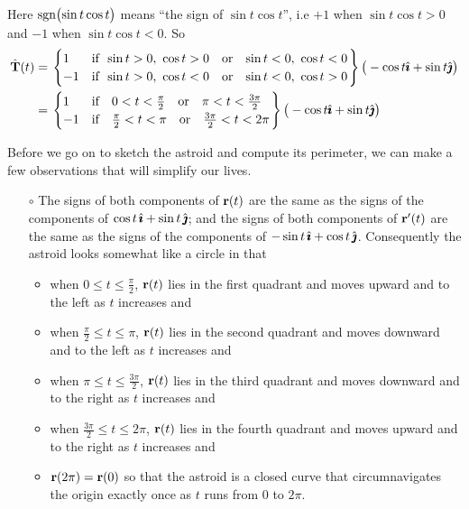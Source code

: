 \begin{eg}
Here $\operatorname{sgn}\!\big(\!\sin t\cos t\big)$ means ``the sign of $\sin t\cos t$'', i.e $+1$ when $\sin t\cos t>0$ and $-1$ when $\sin t\cos t<0$. So
\begin{align*}
\hat\vT(t) 
 &=\left.\begin{cases}1&\text{if $\ \sin t>0,\ \cos t>0\ \ $ 
                              or $\ \ \sin t<0,\ \cos t<0$}\\
                           -1&\text{if $\ \sin t>0,\ \cos t<0\ \ $ 
                              or $\ \ \sin t<0,\ \cos t>0$}
                \end{cases}\right\}\big(-\cos t\hi+\sin t\hj\big)
\\
 &=\left.\begin{cases}1&\text{if $\ \ 0< t<\frac{\pi}{2}\ \ $ 
                                            or $\ \ \pi< t<\frac{3\pi}{2}$}\\
                           -1&\text{if $\ \ \frac{\pi}{2}<t<\pi\ \ $ 
                                          or $\ \ \frac{3\pi}{2}<t<2\pi$}
                \end{cases}\right\}\big(-\cos t\hi+\sin t\hj\big)
\end{align*}

Before we go on to sketch the astroid and compute its perimeter, we can 
make a few observations that will simplify our lives. 
\begin{itemize}\itemsep1pt \parskip0pt  %
\item[$\circ$]
The signs of both components
of $\mathbf{r}(t)$ are the same as the signs of the components of
$\cos t\,\hat{\pmb{\imath}} +\sin t\,\hat{\pmb{\jmath}}$; and the signs of both components
of $\mathbf{r}'(t)$ are the same as the signs of the components of
$-\sin t\,\hat{\pmb{\imath}} +\cos t\,\hat{\pmb{\jmath}}$.
Consequently the astroid looks somewhat like a circle in that
\begin{itemize}\itemsep1pt \parskip0pt  %
\item 
when $0\le t\le \frac{\pi}{2}$, $\mathbf{r}(t)$ lies in the first quadrant
and moves upward and to the left as $t$ increases and
\item 
when $\frac{\pi}{2}\le t\le \pi$, $\mathbf{r}(t)$ lies in the second 
quadrant and moves downward and to the left as $t$ increases and
\item 
when $\pi\le t\le \frac{3\pi}{2}$, $\mathbf{r}(t)$ lies in the third quadrant
and moves downward and to the right as $t$ increases and
\item 
when $\frac{3\pi}{2}\le t\le 2\pi$, $\mathbf{r}(t)$ lies in the fourth
quadrant and moves upward and to the right as $t$ increases and
\item 
$\mathbf{r}(2\pi)=\mathbf{r}(0)$ so that the astroid is a closed curve that
circumnavigates the origin exactly once as $t$ runs from $0$ to $2\pi$.
\end{itemize}


\end{itemize}
\end{eg}
